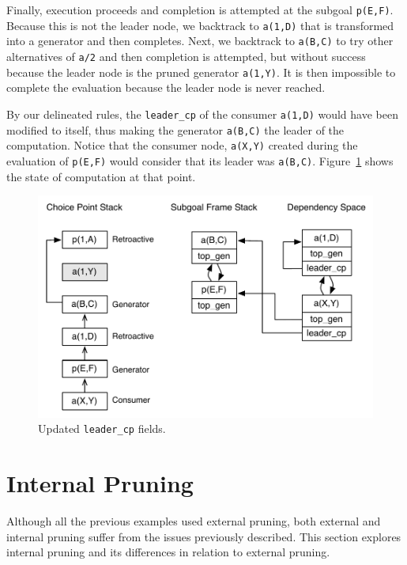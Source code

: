 Finally, execution proceeds and completion is attempted at the subgoal \texttt{p(E,F)}.
Because this is not the leader node, we backtrack to \texttt{a(1,D)} that is transformed
into a generator and then completes. Next, we backtrack to \texttt{a(B,C)} to try other
alternatives of \texttt{a/2} and then completion is attempted, but without success because
the leader node is the pruned generator \texttt{a(1,Y)}. It is then impossible to complete
the evaluation because the leader node is never reached.

By our delineated rules, the \texttt{leader\_cp} of the consumer \texttt{a(1,D)} would have been
modified to itself, thus making the generator \texttt{a(B,C)} the leader of the computation.
Notice that the consumer node, \texttt{a(X,Y)} created during the evaluation of \texttt{p(E,F)} would
consider that its leader was \texttt{a(B,C)}. Figure~\ref{fig:retro_leader_recomputation2} shows the
state of computation at that point.

\begin{figure}[ht]
  \centering
    \includegraphics[scale=0.6]{retro_leader_recomputation2.pdf}
  \caption{Updated \texttt{leader\_cp} fields.}
  \label{fig:retro_leader_recomputation2}
\end{figure}

\section{Internal Pruning}

Although all the previous examples used external pruning, both external and internal pruning
suffer from the issues previously described. This section explores internal pruning
and its differences in relation to external pruning.

